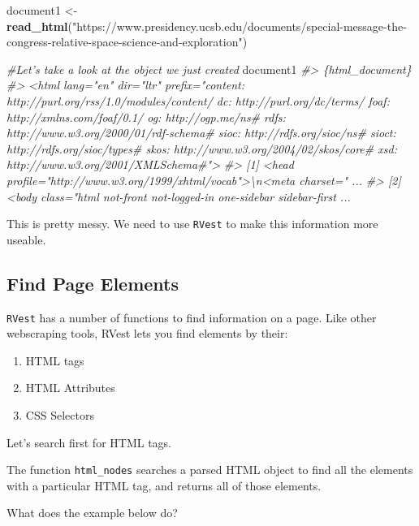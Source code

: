 \documentclass[]{book}
\newenvironment{Shaded}{\begin{snugshade}}{\end{snugshade}}
\newcommand{\CommentTok}[1]{\textcolor[rgb]{0.56,0.35,0.01}{\textit{#1}}}
\newcommand{\KeywordTok}[1]{\textcolor[rgb]{0.13,0.29,0.53}{\textbf{#1}}}
\newcommand{\NormalTok}[1]{#1}
\newcommand{\StringTok}[1]{\textcolor[rgb]{0.31,0.60,0.02}{#1}}
\providecommand{\tightlist}{%
  \setlength{\itemsep}{0pt}\setlength{\parskip}{0pt}}
\begin{document}
\begin{Shaded}
\begin{Highlighting}[]
\NormalTok{document1 <-}\StringTok{ }\KeywordTok{read_html}\NormalTok{(}\StringTok{"https://www.presidency.ucsb.edu/documents/special-message-the-congress-relative-space-science-and-exploration"}\NormalTok{)}

\CommentTok{#Let's take a look at the object we just created}
\NormalTok{document1}
\CommentTok{#> \{html_document\}}
\CommentTok{#> <html lang="en" dir="ltr" prefix="content: http://purl.org/rss/1.0/modules/content/ dc: http://purl.org/dc/terms/ foaf: http://xmlns.com/foaf/0.1/ og: http://ogp.me/ns# rdfs: http://www.w3.org/2000/01/rdf-schema# sioc: http://rdfs.org/sioc/ns# sioct: http://rdfs.org/sioc/types# skos: http://www.w3.org/2004/02/skos/core# xsd: http://www.w3.org/2001/XMLSchema#">}
\CommentTok{#> [1] <head profile="http://www.w3.org/1999/xhtml/vocab">\textbackslash{}n<meta charset=" ...}
\CommentTok{#> [2] <body class="html not-front not-logged-in one-sidebar sidebar-first  ...}
\end{Highlighting}
\end{Shaded}

This is pretty messy. We need to use \texttt{RVest} to make this information more useable.

\hypertarget{find-page-elements}{%
\subsection{Find Page Elements}\label{find-page-elements}}

\texttt{RVest} has a number of functions to find information on a page. Like other webscraping tools, RVest lets you find elements by their:

\begin{enumerate}
\def\labelenumi{\arabic{enumi}.}
\tightlist
\item
  HTML tags
\item
  HTML Attributes
\item
  CSS Selectors
\end{enumerate}

Let's search first for HTML tags.

The function \texttt{html\_nodes} searches a parsed HTML object to find all the elements with a particular HTML tag, and returns all of those elements.

What does the example below do?
\end{document}
